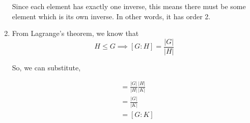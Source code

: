 \documentclass[12pt,letterpaper]{article}
\begin{document}
\begin{enumerate}
      Since each element has exactly one inverse, this means there must be some element which is its own inverse. In other words, it has order 2.

    \item

      From Lagrange's theorem, we know that \[H \le G \implies [G : H] = \frac{|G|}{|H|}\]

      So, we can substitute,

      \begin{align*}
        [G : H][H : K] &= \frac{|G|}{|H|} \frac{|H|}{|K|} \\
        &= \frac{|G|}{|K|} \\
        &= [G : K]
      \end{align*}
  \end{enumerate}
\end{document}
